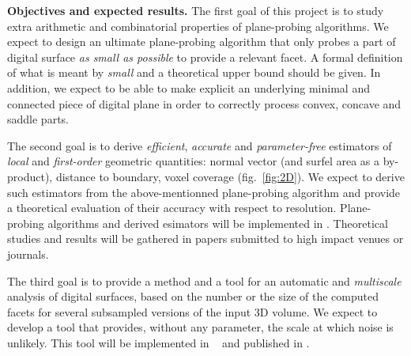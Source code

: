 \noindent\textbf{Objectives and expected results.}
The first goal of this project is to study extra arithmetic and combinatorial properties
of plane-probing algorithms. We expect to design an ultimate plane-probing algorithm that
only probes a part of digital surface \emph{as small as possible} to provide a relevant facet.
A formal definition of what is meant by \emph{small} and a theoretical upper bound should be given.
In addition, we expect to be able to make explicit an underlying minimal and connected piece of
digital plane in order to correctly process convex, concave and saddle parts. 


The second goal is to derive \emph{efficient}, \emph{accurate} and \emph{parameter-free} estimators
of \emph{local} and \emph{first-order} geometric quantities: normal vector (and surfel area as a by-product),
distance to boundary, voxel coverage (fig.~\ref{fig:2D}). We expect to derive such estimators from
the above-mentionned plane-probing algorithm and provide a theoretical evaluation of their accuracy
with respect to resolution. Plane-probing algorithms and derived esimators will be implemented in \DGtal.
Theoretical studies and results will be gathered in papers submitted to high impact venues or journals. 

The third goal is to provide a method and a tool for an automatic and \emph{multiscale} analysis of digital surfaces,
based on the number or the size of the computed facets for several subsampled versions of the input 3D volume. 
We expect to develop a tool that provides, without any parameter, the scale at which noise is unlikely.
This tool will be implemented in \DGtalTools~ and published in \IPOL. 




